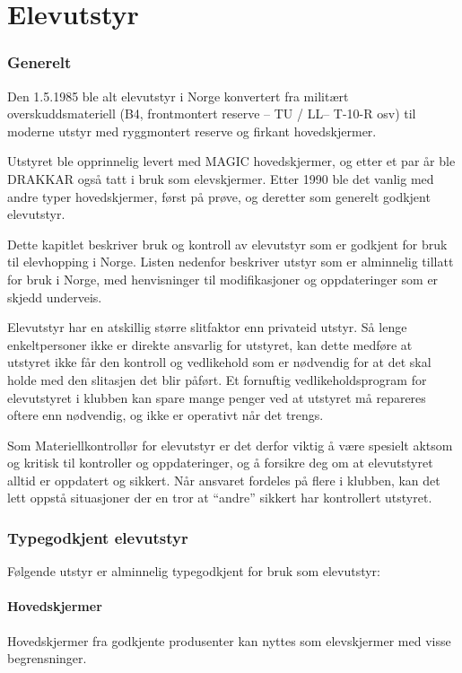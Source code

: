 \part{Elevutstyr}

\section{Generelt}
Den 1.5.1985 ble alt elevutstyr i Norge konvertert fra militært overskuddsmateriell (B4, frontmontert reserve – TU / LL– T-10-R osv) til moderne utstyr med ryggmontert reserve og firkant hovedskjermer.

Utstyret ble opprinnelig levert med MAGIC hovedskjermer, og etter et par år ble DRAKKAR også tatt i bruk som elevskjermer. Etter 1990 ble det vanlig med andre typer hovedskjermer, først på prøve, og deretter som generelt godkjent elevutstyr.

Dette kapitlet beskriver bruk og kontroll av elevutstyr som er godkjent for bruk til elevhopping i Norge. Listen nedenfor beskriver utstyr som er alminnelig tillatt for bruk i Norge, med henvisninger til modifikasjoner og oppdateringer som er skjedd underveis.

Elevutstyr har en atskillig større slitfaktor enn privateid utstyr. Så lenge enkeltpersoner ikke er direkte ansvarlig for utstyret, kan dette medføre at utstyret ikke får den kontroll og vedlikehold som er nødvendig for at det skal holde med den slitasjen det blir påført. Et fornuftig vedlikeholdsprogram for elevutstyret i klubben kan spare mange penger ved at utstyret må repareres oftere enn nødvendig, og ikke er operativt når det trengs.

Som Materiellkontrollør for elevutstyr er det derfor viktig å være spesielt aktsom og kritisk til kontroller og oppdateringer, og å forsikre deg om at elevutstyret alltid er oppdatert og sikkert. Når ansvaret fordeles på flere i klubben, kan det lett oppstå situasjoner der en tror at ``andre'' sikkert har kontrollert utstyret.

\section{Typegodkjent elevutstyr}
Følgende utstyr er alminnelig typegodkjent for bruk som elevutstyr:

\subsection{Hovedskjermer}
Hovedskjermer fra godkjente produsenter kan nyttes som elevskjermer med visse begrensninger.

